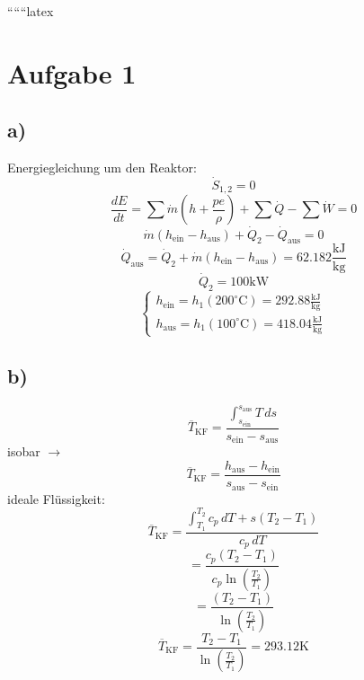 
``````latex


\section*{Aufgabe 1}

\subsection*{a)}
Energiegleichung um den Reaktor:
\[
\dot{S}_{1,2} = 0
\]
\[
\frac{dE}{dt} = \sum \dot{m} (h + \frac{pe}{\rho}) + \sum \dot{Q} - \sum \dot{W} = 0
\]
\[
\dot{m} (h_{\text{ein}} - h_{\text{aus}}) + \dot{Q}_2 - \dot{Q}_{\text{aus}} = 0
\]
\[
\dot{Q}_{\text{aus}} = \dot{Q}_2 + \dot{m} (h_{\text{ein}} - h_{\text{aus}}) = 62.182 \frac{\text{kJ}}{\text{kg}}
\]
\[
\dot{Q}_2 = 100 \text{kW}
\]
\[
\begin{cases}
h_{\text{ein}} = h_1(200^\circ \text{C}) = 292.88 \frac{\text{kJ}}{\text{kg}} \\
h_{\text{aus}} = h_1(100^\circ \text{C}) = 418.04 \frac{\text{kJ}}{\text{kg}}
\end{cases}
\]

\subsection*{b)}
\[
\overline{T}_{\text{KF}} = \frac{\int_{s_{\text{ein}}}^{s_{\text{aus}}} T \, ds}{s_{\text{ein}} - s_{\text{aus}}}
\]
isobar $\rightarrow$
\[
\overline{T}_{\text{KF}} = \frac{h_{\text{aus}} - h_{\text{ein}}}{s_{\text{aus}} - s_{\text{ein}}}
\]
ideale Flüssigkeit:
\[
\overline{T}_{\text{KF}} = \frac{\int_{T_1}^{T_2} c_p \, dT + s(T_2 - T_1)}{c_p \, dT}
\]
\[
= \frac{c_p (T_2 - T_1)}{c_p \ln \left( \frac{T_2}{T_1} \right)}
\]
\[
= \frac{(T_2 - T_1)}{\ln \left( \frac{T_2}{T_1} \right)}
\]
\[
\overline{T}_{\text{KF}} = \frac{T_2 - T_1}{\ln \left( \frac{T_2}{T_1} \right)} = 293.12 \text{K}
\]

